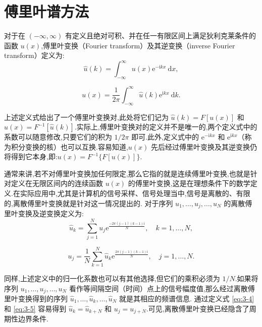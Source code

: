 \section{傅里叶谱方法}

对于在 $(-\infty, \infty)$ 有定义且绝对可积、并在任一有限区间上满足狄利克莱条件的函数 $u(x)$,傅里叶变换（Fourier transform）及其逆变换（inverse Fourier transform）定义为:
\begin{equation}
    \hat{u}(k) = \int_{-\infty}^{\infty} u(x) \mathrm{e}^{-\mathrm{i} k x} \mathrm{~d} x, \label{eq:3-1}
\end{equation}

\begin{equation}
    u(x) = \frac{1}{2 \pi} \int_{-\infty}^{\infty} \hat{u}(k) \mathrm{e}^{\mathrm{i} k x} \mathrm{~d} k. \label{eq:3-2}
\end{equation}

上述定义式给出了一个傅里叶变换对,此处将它们记为 $\hat{u}(k) = F[u(x)]$ 和 $u(x) = F^{-1}[\hat{u}(k)]$.实际上,傅里叶变换对的定义并不是唯一的,两个定义式中的系数可以随意修改,只要它们的积为 $1 / 2 \pi$ 即可.此外,定义式中的 $\mathrm{e}^{-\mathrm{i} k x}$ 和 $\mathrm{e}^{\mathrm{i} k x}$（称为积分变换的核）也可以互换.容易知道,$u(x)$ 先后经过傅里叶变换及其逆变换仍将得到它本身,即:$u(x) = F^{-1}\{F[u(x)]\}$.

通常来讲,若不对傅里叶变换加任何限定,那么它指的就是连续傅里叶变换,也就是针对定义在无限区间内的连续函数 $u(x)$ 的傅里叶变换,这是在理想条件下的数学定义.在实际应用中,尤其是计算机的信号采样、信号处理当中,信号是离散的、有限的,离散傅里叶变换就是针对这一情况提出的.
对于序列 $u_1, \ldots, u_j, \ldots, u_N$ 的离散傅里叶变换及逆变换定义为\cite{ZhangXiaoMatlabWeiFenFangChengGaoXiaoJieFaPuFangFaYuanLiYuShiXian2015}:
\begin{equation}
    \hat{u}_k = \sum_{j=1}^N u_j \mathrm{e}^{\frac{-2 \pi(j-1)(k-1) \mathrm{i}}{N}}, \quad k=1, \ldots, N, \label{eq:3-4}
\end{equation}

\begin{equation}
    u_j = \frac{1}{N} \sum_{k=1}^N \hat{u}_k \mathrm{e}^{\frac{2 \pi(j-1)(k-1) \mathrm{i}}{N}}, \quad j=1, \ldots, N. \label{eq:3-5}
\end{equation}

同样,上述定义中的归一化系数也可以有其他选择,但它们的乘积必须为 $1 / N$.如果将序列 $u_1, \ldots, u_j, \ldots, u_N$ 看作等间隔空间（时间）点上的信号幅度值,那么经过离散傅里叶变换得到的序列 $\hat{u}_1, \ldots, \hat{u}_k, \ldots, \hat{u}_N$ 就是其相应的频谱信息.
通过定义式 \eqref{eq:3-4} 和 \eqref{eq:3-5} 容易得到 $\hat{u}_k = \hat{u}_{k+N}$ 和 $u_j = u_{j+N}$.可见,离散傅里叶变换已经隐含了周期性边界条件.

